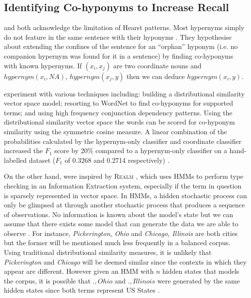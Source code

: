 \subsection{Identifying Co-hyponyms to Increase Recall}
\citet{Snow2004} and \citet{ritter2009anyway} both acknowledge the limitation of Hearst patterns.  
Most hypernyms simply do not feature in the same sentence with their hyponyms \citep{Snow2004, ritter2009anyway}.  They hypothesise about extending the confines of the sentence for an ``orphan'' hyponym (i.e. no companion hypernym was found for it in a sentence) by finding co-hyponyms with known hypernyms.  If $(x_i, x_j)$ are two coordinate nouns and $hypernym(x_i, NA)$, $hypernym(x_j, y)$ then we can deduce $hypernym(x_i, y)$.

\citeauthor{Snow2004} experiment with various techniques including: building a distributional similarity vector space model; resorting to WordNet to find co-hyponyms for supported terms; and using high frequency conjunction dependency patterns.  Using the distributional similarity vector space the words can be scored for co-hyponym similarity using the symmetric cosine measure.  A linear combination of the probabilities calculated by the hypernym-only classifier and coordinate classifier increased the $F_1$ score by 20\% compared to a hypernym-only classifier on a hand-labelled dataset ($F_1$ of 0.3268 and 0.2714 respectively) \citep{Snow2004}.

On the other hand, \citeauthor{ritter2009anyway} were inspired by \textsc{Realm} \citep{downey2007sparse}, which uses \ac{HMM}s to perform type checking in an Information Extraction system, especially if the term in question is sparsely represented in vector space.  In \ac{HMM}s, a hidden stochastic process can only be glimpsed at through another stochastic process that produces a sequence of observations.  No information is known about the model's state but we can assume that there exists some model that can generate the data we are able to observe \citep{rabiner1989tutorial}.  For instance, \textit{Pickerington, Ohio} and \textit{Chicago, Illinois} are both cities but the former will be mentioned much less frequently in a balanced corpus.  Using traditional distributional similarity measures, it is unlikely that \textit{Pickerington} and \textit{Chicago} will be deemed similar since the contexts in which they appear are different.  However given an \ac{HMM} with $n$ hidden states that models the corpus, it is possible that $., Ohio$ and $., Illinois$ were generated by the same hidden states since both terms represent US States \citep{ritter2009anyway}.

